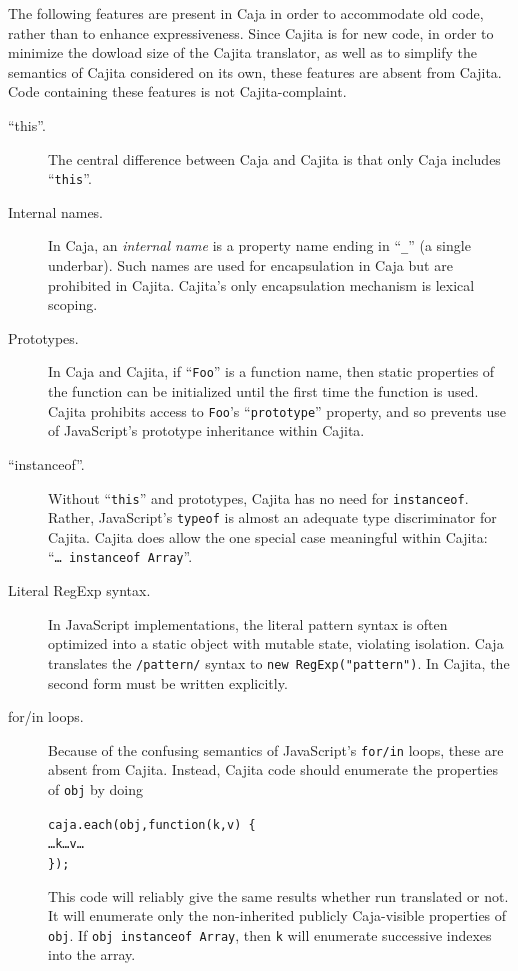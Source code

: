 \documentclass[letterpaper,twocolumn,10pt]{article}
\newcommand{\code}[1]{{\tt {#1}}}              %
\begin{document}
The following features are present in Caja in order to accommodate old code, 
rather than to enhance expressiveness. Since Cajita is for new code, in order 
to minimize the dowload size of the Cajita translator, as well as to simplify 
the semantics of Cajita considered on its own, these features are absent from 
Cajita. Code containing these features is not Cajita-complaint.

\begin{description}
    
    \item[``this''.] The central difference between Caja and Cajita is that 
    only Caja includes ``\code{this}''.
    
    \item[Internal names.] In Caja, an \emph{internal name} is a property 
    name ending in ``\code{\_}'' (a single underbar). Such names are used for 
    encapsulation in Caja but are prohibited in Cajita. Cajita's only 
    encapsulation mechanism is lexical scoping.
    
    \item[Prototypes.] In Caja and Cajita, if ``\code{Foo}'' is a function 
    name, then static properties of the function can be initialized until the 
    first time the function is used. Cajita prohibits access to \code{Foo}'s 
    ``\code{prototype}'' property, and so prevents use of JavaScript's 
    prototype inheritance within Cajita.
    
    \item[``instanceof''.] Without ``\code{this}'' and prototypes, Cajita has 
    no need for \code{instanceof}. Rather, JavaScript's \code{typeof} is 
    almost an adequate type discriminator for Cajita. Cajita does allow the 
    one special case meaningful within Cajita: ``\code{{\ldots}\ instanceof 
    Array}''.
    
    \item[Literal RegExp syntax.] In JavaScript implementations, the literal 
    pattern syntax is often optimized into a static object with mutable 
    state, violating isolation. Caja translates the \code{/pattern/} syntax 
    to \code{new RegExp("pattern")}. In Cajita, the second form must be
    written explicitly.
    
    \item[for/in loops.] Because of the confusing semantics of JavaScript's 
    \code{for/in} loops, these are absent from Cajita. Instead, Cajita code 
    should enumerate the properties of \code{obj} by doing
%
\begin{alltt}
    caja.each(obj, function(k, v)\ \{ 
      {\ldots}k{\ldots}v\ldots 
    \});
\end{alltt}
%
    This code will reliably give the same results whether run translated or 
    not. It will enumerate only the non-inherited publicly Caja-visible 
    properties of \code{obj}. If \code{obj instanceof Array}, then \code{k} 
    will enumerate successive indexes into the array.
    

\end{description}
\end{document}
